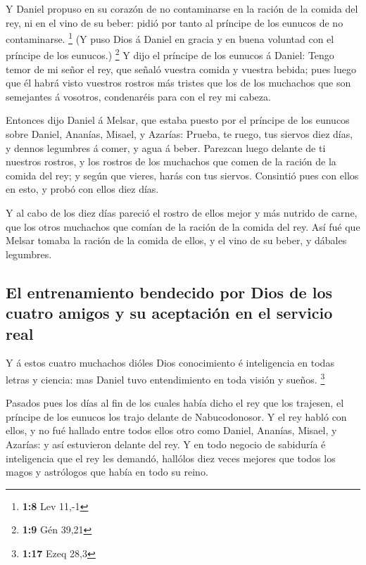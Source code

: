  Y Daniel propuso en su corazón de no contaminarse en la
ración de la comida del rey, ni en el vino de su beber: pidió por tanto
al príncipe de los eunucos de no contaminarse. \footnote{\textbf{1:8}
  Lev 11,-1}  (Y puso Dios á Daniel en gracia y en buena
voluntad con el príncipe de los eunucos.) \footnote{\textbf{1:9} Gén
  39,21}  Y dijo el príncipe de los eunucos á Daniel:
Tengo temor de mi señor el rey, que señaló vuestra comida y vuestra
bebida; pues luego que él habrá visto vuestros rostros más tristes que
los de los muchachos que son semejantes á vosotros, condenaréis para con
el rey mi cabeza.

 Entonces dijo Daniel á Melsar, que estaba puesto por el
príncipe de los eunucos sobre Daniel, Ananías, Misael, y Azarías:
 Prueba, te ruego, tus siervos diez días, y dennos
legumbres á comer, y agua á beber.  Parezcan luego
delante de ti nuestros rostros, y los rostros de los muchachos que comen
de la ración de la comida del rey; y según que vieres, harás con tus
siervos.  Consintió pues con ellos en esto, y probó con
ellos diez días.

 Y al cabo de los diez días pareció el rostro de ellos
mejor y más nutrido de carne, que los otros muchachos que comían de la
ración de la comida del rey.  Así fué que Melsar tomaba
la ración de la comida de ellos, y el vino de su beber, y dábales
legumbres.

\hypertarget{el-entrenamiento-bendecido-por-dios-de-los-cuatro-amigos-y-su-aceptaciuxf3n-en-el-servicio-real}{%
\subsection{El entrenamiento bendecido por Dios de los cuatro amigos y
su aceptación en el servicio
real}\label{el-entrenamiento-bendecido-por-dios-de-los-cuatro-amigos-y-su-aceptaciuxf3n-en-el-servicio-real}}

 Y á estos cuatro muchachos dióles Dios conocimiento é
inteligencia en todas letras y ciencia: mas Daniel tuvo entendimiento en
toda visión y sueños. \footnote{\textbf{1:17} Ezeq 28,3}

 Pasados pues los días al fin de los cuales había dicho
el rey que los trajesen, el príncipe de los eunucos los trajo delante de
Nabucodonosor.  Y el rey habló con ellos, y no fué
hallado entre todos ellos otro como Daniel, Ananías, Misael, y Azarías:
y así estuvieron delante del rey.  Y en todo negocio de
sabiduría é inteligencia que el rey les demandó, hallólos diez veces
mejores que todos los magos y astrólogos que había en todo su reino.

